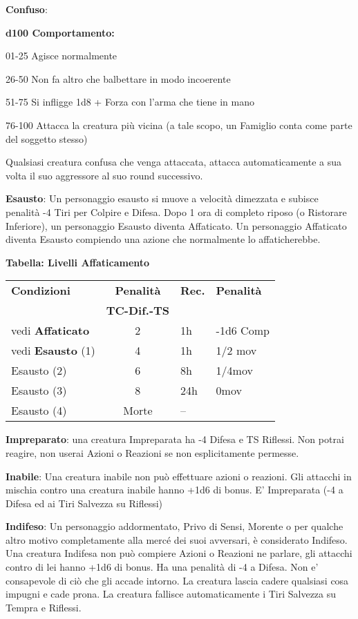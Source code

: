 \documentclass[a4paper,12 pt,openany]{book}
\begin{document}
\begin{textblock*}{19 cm}
\begin{multicols}{2}
\textbf{Confuso}: 

\textbf{d100 Comportamento:}

01-25 Agisce normalmente

26-50 Non fa altro che balbettare in modo incoerente

51-75 Si infligge 1d8 + Forza con l'arma che tiene in mano

76-100 Attacca la creatura più vicina (a tale scopo, un Famiglio conta come parte del soggetto stesso)

Qualsiasi creatura confusa che venga attaccata, attacca automaticamente a sua volta il suo aggressore al suo round successivo.

\textbf{Esausto}: Un personaggio esausto si muove a velocità dimezzata e subisce penalità -4 Tiri per Colpire e Difesa. Dopo 1 ora di completo riposo (o Ristorare Inferiore), un personaggio Esausto diventa Affaticato. Un personaggio Affaticato diventa Esausto compiendo una azione che normalmente lo affaticherebbe.

\medskip

\textbf{Tabella: Livelli Affaticamento}

\medskip

\begin{tabularx}{0.45\textwidth}{lcll}
	\textbf{Condizioni}& \textbf{Penalità}&\textbf{Rec.}&\textbf{Penalità}\\
	&\textbf{TC-Dif.-TS}&&\\
	\hline
	vedi \textbf{Affaticato}&2&1h&-1d6 Comp\\
	vedi \textbf{Esausto} (1)&4&1h&1/2 mov\\
	Esausto (2) &6&8h&1/4mov\\
	Esausto (3) &8&24h&0mov\\
	Esausto (4) &Morte&--&\\
\end{tabularx}

\textbf{Impreparato}: una creatura Impreparata ha -4 Difesa e TS Riflessi. Non potrai reagire, non userai Azioni o Reazioni se non esplicitamente permesse.

\textbf{Inabile}: Una creatura inabile non può effettuare azioni o reazioni. Gli attacchi in mischia contro una creatura inabile hanno +1d6 di bonus. E' Impreparata (-4 a Difesa ed ai Tiri Salvezza su Riflessi)

\textbf{Indifeso}: Un personaggio addormentato, Privo di Sensi, Morente o per qualche altro motivo completamente alla mercé dei suoi avversari, è considerato Indifeso. Una creatura Indifesa non può compiere Azioni o Reazioni ne parlare, gli attacchi contro di lei hanno +1d6 di bonus. Ha una penalità di -4 a Difesa. Non e' consapevole di ciò che gli accade intorno. La creatura lascia cadere qualsiasi cosa impugni e cade prona. La creatura fallisce automaticamente i Tiri Salvezza su Tempra e Riflessi.



\end{multicols}
\end{textblock*}
\end{document}
